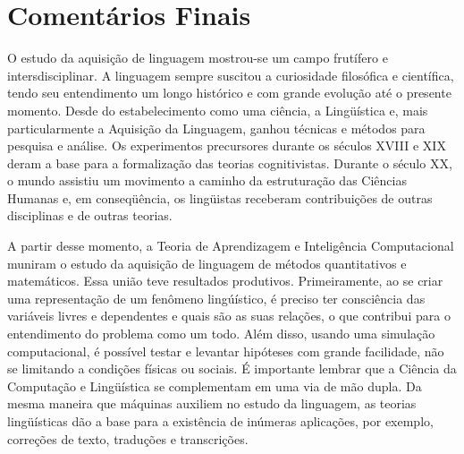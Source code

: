 \section*{Comentários Finais}

O estudo da aquisição de linguagem mostrou-se um campo frutífero e intersdisciplinar. A linguagem sempre suscitou a curiosidade filosófica e científica, tendo seu entendimento um longo histórico e com grande evolução até o presente momento. Desde do estabelecimento como uma ciência, a Lingüística e, mais particularmente a Aquisição da Linguagem, ganhou técnicas e métodos para pesquisa e análise. Os experimentos precursores durante os séculos XVIII e XIX deram a base para a formalização das teorias cognitivistas. Durante o século XX, o mundo assistiu um movimento a caminho da estruturação das Ciências Humanas e, em conseqüência, os lingüistas receberam contribuições de outras disciplinas e de outras teorias.

A partir desse momento, a Teoria de Aprendizagem e Inteligência Computacional muniram o estudo da aquisição de linguagem de métodos quantitativos e matemáticos. Essa união teve resultados produtivos. Primeiramente, ao se criar uma representação de um fenômeno lingúístico, é preciso ter consciência das variáveis livres e dependentes e quais são as suas relações, o que contribui para o entendimento do problema como um todo. Além disso,  usando uma simulação computacional, é possível testar e levantar hipóteses com grande facilidade, não se limitando a condições físicas ou sociais. É importante lembrar que a Ciência da Computação e Lingüística se complementam em uma via de mão dupla. Da mesma maneira que máquinas auxiliem no estudo da linguagem, as teorias lingüísticas dão a base para a existência de inúmeras aplicações, por exemplo, correções de texto, traduções e transcrições.